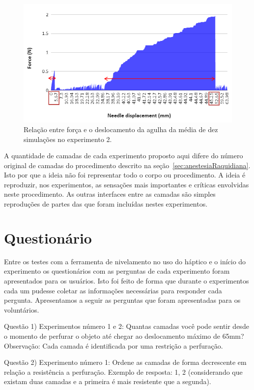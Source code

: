 \begin{figure}[ht!]
    \centering
    \includegraphics[width=0.8\linewidth]{capitulos/figuras/Experiment 2 - Force x Needle displacement - marked.PNG} 
    \caption{Relação entre força e o deslocamento da agulha da média de dez simulações no experimento 2.}
    \label{fig:forcaDeslocamentoExperimento2}
\end{figure}

A quantidade de camadas de cada experimento proposto aqui difere do número original de camadas do procedimento descrito na seção~\ref{sec:anestesiaRaquidiana}. Isto por que a ideia não foi representar todo o corpo ou procedimento. A ideia é reproduzir, nos experimentos, as sensações mais importantes e críticas envolvidas neste procedimento. As outras interfaces entre as camadas são simples reproduções de partes das que foram incluídas nestes experimentos.

\section{Questionário}
\label{sec:questionario}

Entre os testes com a ferramenta de nivelamento no uso do háptico e o início do experimento os questionários com as perguntas de cada experimento foram apresentados para os usuários. Isto foi feito de forma que durante o experimentos cada um pudesse coletar as informações necessárias para responder cada pergunta. Apresentamos a seguir as perguntas que foram apresentadas para os voluntários.

Questão 1) Experimentos número 1 e 2: Quantas camadas você pode sentir desde o momento de perfurar o objeto até chegar ao deslocamento máximo de 65mm? 
Observação: Cada camada é identificada por uma restrição a perfuração.

Questão 2) Experimento número 1: Ordene as camadas de forma decrescente em relação a resistência a perfuração.    
Exemplo de resposta: 1, 2 (considerando que existam duas camadas e a primeira é mais resistente que a segunda).


